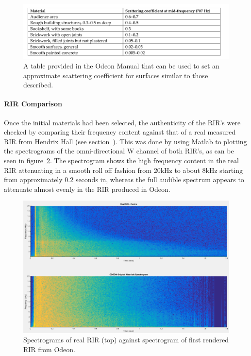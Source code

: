\documentclass[../../main.tex]{subfiles}
\begin{document}
			\begin{figure}[H]
				\centerline{\includegraphics[scale = 0.3]{Sections/Implementation/Odeon/images/scatteringCoefficients.png}}
				\caption{A table provided in the Odeon Manual \cite{odeonManual} that can be used to set an approximate scattering coefficient for surfaces similar to those described.}
				\label{odeonTable}
			\end{figure}
		
		\paragraph{RIR Comparison}

			Once the initial materials had been selected, the authenticity of the \ac{RIR}'s were checked by comparing their frequency content against that of a real measured \ac{RIR} from Hendrix Hall (see section~). This was done by using Matlab to plotting the spectrograms of the omni-directional W channel of both \ac{RIR}'s, as can be seen in figure~\ref{compareOriginal}. The spectrogram shows the high frequency content in the real \ac{RIR} attenuating in a smooth roll off fashion from 20kHz to about 8kHz starting from approximately 0.2 seconds in, whereas the full audible spectrum appears to attenuate almost evenly in the \ac{RIR} produced in Odeon.

			\begin{figure}[H]
				\centerline{\includegraphics[scale = 0.3]{Sections/Implementation/Odeon/images/MaterialCompare/OriginalMaterials/original.png}}
				\caption{Spectrograms of real \ac{RIR} (top) against spectrogram of first rendered \ac{RIR} from Odeon.}
				\label{compareOriginal}
			\end{figure}
\end{document}
